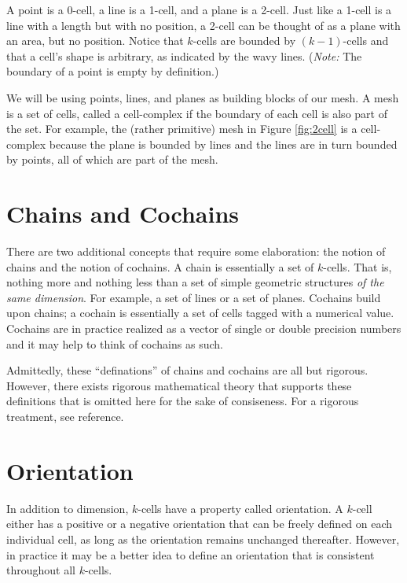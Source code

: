 A point is a 0-cell, a line is a 1-cell, and a plane is a 2-cell. Just like a 1-cell is a line with a length but with no position, a 2-cell can be thought of as a plane with an area, but no position. Notice that $k$-cells are bounded by $(k-1)$-cells and that a cell's shape is arbitrary, as indicated by the wavy lines. (\textit{Note:} The boundary of a point is empty by definition.)

We will be using points, lines, and planes as building blocks of our mesh. A mesh is a set of cells, called a cell-complex if the boundary of each cell is also part of the set. For example, the (rather primitive) mesh in Figure \ref{fig:2cell} is a cell-complex because the plane is bounded by lines and the lines are in turn bounded by points, all of which are part of the mesh.

\section{Chains and Cochains}

There are two additional concepts that require some elaboration: the notion of chains and the notion of cochains. A chain is essentially a set of $k$-cells. That is, nothing more and nothing less than a set of simple geometric structures \emph{of the same dimension}. For example, a set of lines or a set of planes. Cochains build upon chains; a cochain is essentially a set of cells tagged with a numerical value. Cochains are in practice realized as a vector of single or double precision numbers and it may help to think of cochains as such.

Admittedly, these ``definations'' of chains and cochains are all but rigorous. However, there exists rigorous mathematical theory that supports these definitions that is omitted here for the sake of consiseness. For a rigorous treatment, see reference.


\section{Orientation}

In addition to dimension, $k$-cells have a property called orientation. A $k$-cell either has a positive or a negative orientation that can be freely defined on each individual cell, as long as the orientation remains unchanged thereafter. However, in practice it may be a better idea to define an orientation that is consistent throughout all $k$-cells.

